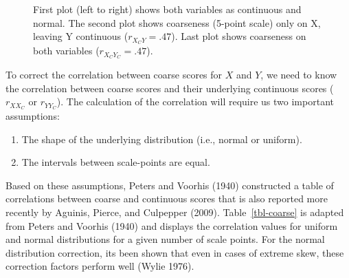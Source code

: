 \documentclass[
  letterpaper,
  DIV=11,
  numbers=noendperiod]{scrreprt}
\providecommand{\tightlist}{%
  \setlength{\itemsep}{0pt}\setlength{\parskip}{0pt}}\usepackage{longtable,booktabs,array}
\begin{document}
\begin{figure}[H]


\caption{\label{fig-coarse-other}First plot (left to right) shows both
variables as continuous and normal. The second plot shows coarseness
(5-point scale) only on X, leaving Y continuous (\(r_{X_CY}=.47\)). Last
plot shows coarseness on both variables (\(r_{X_CY_C}=.47\)).}

\end{figure}%

To correct the correlation between coarse scores for \(X\) and \(Y\), we
need to know the correlation between coarse scores and their underlying
continuous scores (\(r_{XX_C}\) or \(r_{YY_C}\)). The calculation of the
correlation will require us two important assumptions:

\begin{enumerate}
\def\labelenumi{\arabic{enumi})}
\tightlist
\item
  The shape of the underlying distribution (i.e., normal or uniform).
\item
  The intervals between scale-points are equal.
\end{enumerate}

Based on these assumptions, Peters and Voorhis (1940) constructed a
table of correlations between coarse and continuous scores that is also
reported more recently by Aguinis, Pierce, and Culpepper (2009).
Table~\ref{tbl-coarse} is adapted from Peters and Voorhis (1940) and
displays the correlation values for uniform and normal distributions for
a given number of scale points. For the normal distribution correction,
its been shown that even in cases of extreme skew, these correction
factors perform well (Wylie 1976).
\end{document}
